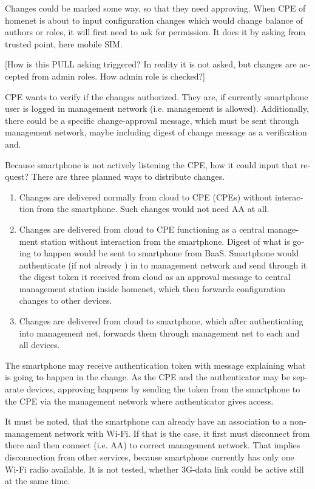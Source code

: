 \documentclass[12pt,a4paper,english]{tutthesis}
\begin{document}
\begin{otherlanguage}{english}
Changes could be marked some way, so that they need approving.
When CPE of homenet is about to input configuration
changes which would change balance of authors or roles,
it will first need to ask for permission. 
It does it by asking from trusted point, here mobile SIM. 

[How is this PULL asking triggered? In reality it is not asked, but
changes are accepted from admin roles. How admin role is checked?]

CPE wants to verify if the changes authorized. They are, if currently
smartphone user is logged in management network (i.e. management is allowed).
Additionally, there could be a  specific change-approval message,
which must be sent through  management network, maybe
including digest of change message as a verification and.

Because smartphone is not actively listening the CPE, how it could
input that request? 
There are three planned ways to distribute changes.

\begin{enumerate}
\item Changes are delivered normally from cloud to CPE (CPEs) without
interaction  from the smartphone. Such changes would not need
AA at all.

\item Changes are delivered from cloud to CPE functioning as a central
management station without interaction from the smartphone. 
Digest of what is going to happen would be sent to smartphone from
BaaS. Smartphone would authenticate (if not already ) in to
management network and send through it the digest token it received from cloud 
as an approval message to central management station
inside homenet, which then forwards configuration changes to other devices.

\item Changes are delivered from cloud to smartphone, which after
authenticating into management net, forwards them through management
net to each and all devices.
\end{enumerate}


The smartphone may receive authentication token with 
message explaining what is going to happen in the change.
As the CPE and the authenticator may be separate devices, approving
happens by sending the token from the smartphone to the CPE via the
management network where authenticator gives access.

It must be noted, that the smartphone can already have an association
to a non-management network with Wi-Fi. If that is the case, it first
must disconnect from there and then connect (i.e. AA) to correct management
network. That implies disconnection from other services, because 
smartphone currently has only one Wi-Fi radio available. 
It is not tested, whether 3G-data link could be active still at the
same time.




\end{otherlanguage}
\end{document}

